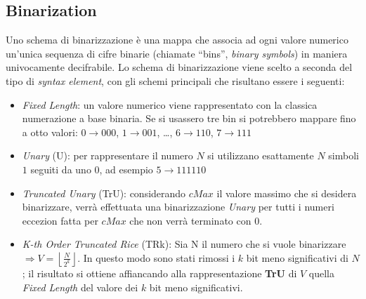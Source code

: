 \subsection{Binarization}
Uno schema di binarizzazione è una mappa che associa ad ogni valore numerico 
un'unica sequenza di cifre binarie (chiamate ``bins'', \emph{binary symbols}) 
in maniera univocamente decifrabile. Lo schema di binarizzazione viene scelto a
seconda del tipo di \emph{syntax element}, con gli schemi principali che 
risultano essere i seguenti:
\begin{itemize}
\item \emph{Fixed Length}: un valore numerico viene rappresentato con la 
  classica numerazione a base binaria. Se si usassero tre bin si potrebbero 
  mappare fino a otto valori: $0 \rightarrow 000$, $1 \rightarrow 001$, 
  {\ldots}, $6 \rightarrow 110$, $7 \rightarrow 111$

\item \emph{Unary} (U): per rappresentare il numero $N$ si utilizzano 
  esattamente $N$ simboli $1$ seguiti da uno $0$, ad esempio $5 \rightarrow 
  111110$

\item \emph{Truncated Unary} (TrU): considerando $cMax$ il valore massimo che 
  si desidera binarizzare, verrà effettuata una binarizzazione \emph{Unary} 
  per tutti i numeri eccezion fatta per $cMax$ che non verrà terminato con $0$.

\item \emph{K-th Order Truncated Rice} (TRk): Sia N il numero che si vuole 
  binarizzare $\Rightarrow V = \left\lfloor\frac{N}{2^k}\right\rfloor$. In 
  questo modo sono stati rimossi i $k$ bit meno significativi di $N$; il 
  risultato si ottiene affiancando alla rappresentazione \textbf{TrU} di $V$ 
  quella \emph{Fixed Length} del valore dei $k$ bit meno significativi.

\end{itemize}

